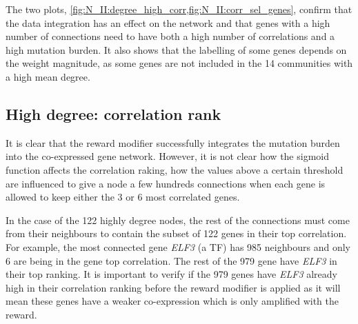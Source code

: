 The two plots, \cref{fig:N_II:degree_high_corr,fig:N_II:corr_sel_genes}, confirm that the data integration has an effect on the network and that genes with a high number of connections need to have both a high number of correlations and a high mutation burden. It also shows that the labelling of some genes depends on the weight magnitude, as some genes are not included in the 14 communities with a high mean degree.




\subsection{High degree: correlation rank} \label{s:N_II:corr_rank}




It is clear that the reward modifier successfully integrates the mutation burden into the co-expressed gene network. However, it is not clear how the sigmoid function affects the correlation raking, how the values above a certain threshold are influenced to give a node a few hundreds connections when each gene is allowed to keep either the 3 or 6 most correlated genes.

In the case of the 122 highly degree nodes, the rest of the connections must come from their neighbours to contain the subset of 122 genes in their top correlation. For example, the most connected gene \textit{ELF3} (a TF) has 985 neighbours and only 6 are being in the gene top correlation. The rest of the 979 gene have \textit{ELF3} in their top ranking. It is important to verify if the 979 genes have \textit{ELF3} already high in their correlation ranking before the reward modifier is applied as it will mean these genes have a weaker co-expression which is only amplified with the reward.

